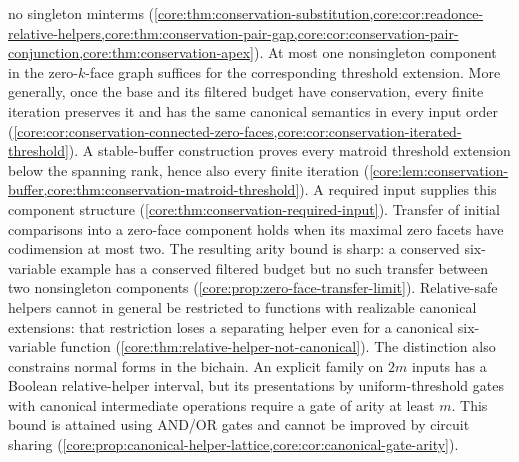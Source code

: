 no singleton minterms
(\cref{core:thm:conservation-substitution,core:cor:readonce-relative-helpers,core:thm:conservation-pair-gap,core:cor:conservation-pair-conjunction,core:thm:conservation-apex}).
At most one nonsingleton component in the zero-$k$-face graph suffices
for the corresponding threshold extension. More generally, once the
base and its filtered budget have conservation, every finite iteration
preserves it and has the same canonical semantics in every input order
(\cref{core:cor:conservation-connected-zero-faces,core:cor:conservation-iterated-threshold}).
A stable-buffer construction proves every matroid threshold extension
below the spanning rank, hence also every finite iteration
(\cref{core:lem:conservation-buffer,core:thm:conservation-matroid-threshold}).
A required input supplies this component structure
(\cref{core:thm:conservation-required-input}).
Transfer of initial comparisons into a zero-face component holds when
its maximal zero facets have codimension at most two. The resulting
arity bound is sharp: a conserved six-variable example has a conserved
filtered budget but no such transfer between two nonsingleton components
(\cref{core:prop:zero-face-transfer-limit}).
Relative-safe helpers cannot in general be restricted to functions with
realizable canonical extensions: that restriction loses a separating
helper even for a canonical six-variable function
(\cref{core:thm:relative-helper-not-canonical}).
The distinction also constrains normal forms in the bichain. An explicit
family on $2m$ inputs has a Boolean relative-helper interval, but its
presentations by uniform-threshold gates with canonical intermediate
operations require a gate of arity at least $m$. This bound is attained
using AND/OR gates and cannot be improved by circuit sharing
(\cref{core:prop:canonical-helper-lattice,core:cor:canonical-gate-arity}).

